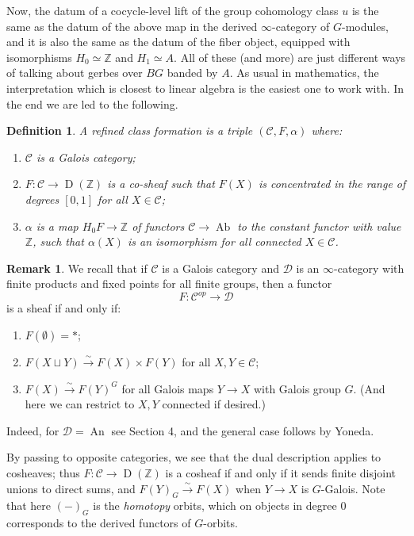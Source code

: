 \documentclass[12pt]{article}
\newtheorem{definition}[theorem]{Definition}
\theoremstyle{definition}
\newtheorem{remark}[theorem]{Remark}
\newcommand{\on}{\operatorname}
\newcommand{\mc}{\mathcal}
\newcommand{\mbb}{\mathbb}
\begin{document}
Now, the datum of a cocycle-level lift of the group cohomology class $u$ is the same as the datum of the above map in the derived $\infty$-category of $G$-modules, and it is also the same as the datum of the fiber object, equipped with isomorphisms $H_0\simeq\mbb{Z}$ and $H_1\simeq A$.  All of these (and more) are just different ways of talking about gerbes over $BG$ banded by $A$.  As usual in mathematics, the interpretation which is closest to linear algebra is the easiest one to work with.  In the end we are led to the following.

\begin{definition}\label{rcf}
A \emph{refined class formation} is a triple $(\mc{C},F,\alpha)$ where:
\begin{enumerate}
\item $\mc{C}$ is a Galois category;
\item $F:\mc{C}\to \on{D}(\mbb{Z})$ is a \emph{co-sheaf} such that $F(X)$ is concentrated in the range of degrees $[0,1]$ for all $X\in\mc{C}$;
\item $\alpha$ is a map $H_0F\to \mbb{Z}$ of functors $\mc{C}\to \on{Ab}$ to the constant functor with value $\mbb{Z}$, such that $\alpha(X)$ is an isomorphism for all connected $X\in\mc{C}$.
\end{enumerate}
\end{definition}

\begin{remark}\label{whatisaderivedsheaf}
We recall that if $\mc{C}$ is a Galois category and $\mc{D}$ is an $\infty$-category with finite products and fixed points for all finite groups, then a functor
$$F:\mc{C}^{op}\to\mc{D}$$
is a sheaf if and only if:
\begin{enumerate}
\item $F(\emptyset) = \ast$;
\item $F(X\sqcup Y)\overset{\sim}{\rightarrow} F(X)\times F(Y)$ for all $X,Y\in\mc{C}$;
\item $F(X)\overset{\sim}{\rightarrow} F(Y)^G$ for all Galois maps $Y\to X$ with Galois group $G$. (And here we can restrict to $X,Y$ connected if desired.)
\end{enumerate}
Indeed, for $\mc{D}=\on{An}$ see \cite{cm1} Section 4, and the general case follows by Yoneda.

By passing to opposite categories, we see that the dual description applies to cosheaves; thus $F:\mc{C}\to\on{D}(\mbb{Z})$ is a cosheaf if and only if it sends finite disjoint unions to direct sums, and $F(Y)_G\overset{\sim}{\rightarrow} F(X)$ when $Y\to X$ is $G$-Galois.  Note that here $(-)_G$ is the \emph{homotopy} orbits, which on objects in degree $0$ corresponds to the derived functors of $G$-orbits.
\end{remark}
\end{document}
